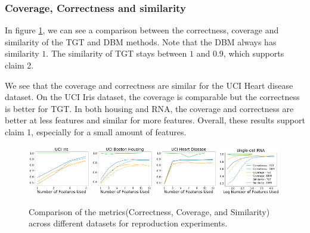 \subsubsection{Coverage, Correctness and similarity}
In figure \ref{fig:reproduced_tgt_metrics}, we can see a comparison between the correctness, coverage and similarity of the TGT and DBM methods. Note that the DBM always has similarity $1$. The similarity of TGT stays between $1$ and $0.9$, which supports claim 2. 

We see that the coverage and correctness are similar for the UCI Heart disease dataset. On the UCI Iris dataset, the coverage is comparable but the correctness is better for TGT. In both housing and RNA, the coverage and correctness are better at less features and similar for more features. Overall, these results support claim 1, especially for a small amount of features.
\begin{figure}[H]
    \includegraphics[width=0.24\textwidth]{images/tffigures/iris-tradeoff.png}
    \includegraphics[width=0.24\textwidth]{images/tffigures/housing-tradeoff.png}
    \includegraphics[width=0.24\textwidth]{images/tffigures/heart-tradeoff.png}
    \includegraphics[width=0.24\textwidth]{images/tffigures/bipolar-tradeoff.png}
    \caption{Comparison of the metrics(Correctness, Coverage, and Similarity) across different datasets for reproduction experiments.}
    \label{fig:reproduced_tgt_metrics}
\end{figure}
